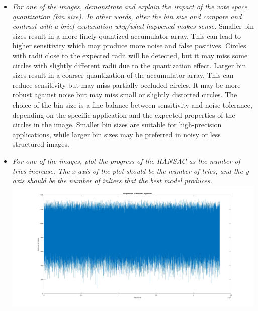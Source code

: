 \documentclass[11pt]{article}
\begin{document}
\begin{itemize}
        \item \textit{For one of the images, demonstrate and explain the impact of the vote space quantization (bin
        size). In other words, alter the bin size and compare and contrast with a brief explanation why/what happened
        makes sense.}\newline
        Smaller bin sizes result in a more finely quantized accumulator array. This can lead to higher sensitivity
        which may produce more noise and false positives. Circles with radii close to the expected radii will be
        detected, but it may miss some circles with slightly different radii due to the quantization effect.
        Larger bin sizes result in a coarser quantization of the accumulator array. This can reduce sensitivity but
        may miss partially occluded circles. It may be more robust against noise but may miss small or slightly
        distorted circles.\newline
        The choice of the bin size is a fine balance between sensitivity and noise tolerance, depending on the specific
        application and the expected properties of the circles in the image.
        Smaller bin sizes are suitable for high-precision applications,
        while larger bin sizes may be preferred in noisy or less structured images.\newline

        \item \textit{For one of the images, plot the progress of the RANSAC as the number of tries increase. The x axis
        of the plot should be the number of tries, and the y axis should be the number of inliers that the best model
        produces.}\newline
        \includegraphics[width=\textwidth]{Output Pictures/inlier_progression}\newline

    \end{itemize}
\end{document}
